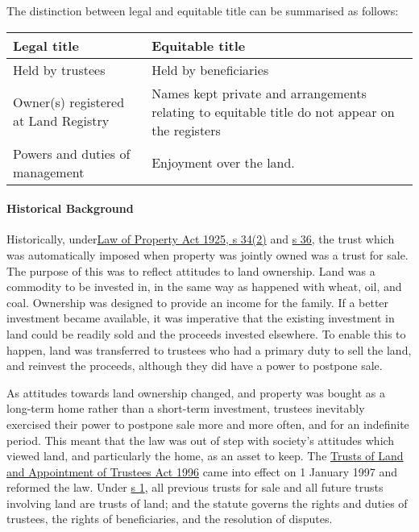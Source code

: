\documentclass[
]{article}
\begin{document}
The distinction between legal and equitable title can be summarised as
follows:

\begin{longtable}[]{@{}ll@{}}
\toprule()
Legal title & Equitable title \\
\midrule()
\endhead
Held by trustees & Held by beneficiaries \\
Owner(s) registered at Land Registry & Names kept private and
arrangements relating to equitable title do not appear on the
registers \\
Powers and duties of management & Enjoyment over the land. \\
\bottomrule()
\end{longtable}

\hypertarget{historical-background}{%
\paragraph{Historical Background}\label{historical-background}}

Historically,
under\href{https://www.legislation.gov.uk/ukpga/Geo5/15-16/20/section/34}{Law
of Property Act 1925, s 34(2)} and
\href{https://www.legislation.gov.uk/ukpga/Geo5/15-16/20/section/36}{s
36}, the trust which was automatically imposed when property was jointly
owned was a trust for sale. The purpose of this was to reflect attitudes
to land ownership. Land was a commodity to be invested in, in the same
way as happened with wheat, oil, and coal. Ownership was designed to
provide an income for the family. If a better investment became
available, it was imperative that the existing investment in land could
be readily sold and the proceeds invested elsewhere. To enable this to
happen, land was transferred to trustees who had a primary duty to sell
the land, and reinvest the proceeds, although they did have a power to
postpone sale.

As attitudes towards land ownership changed, and property was bought as
a long-term home rather than a short-term investment, trustees
inevitably exercised their power to postpone sale more and more often,
and for an indefinite period. This meant that the law was out of step
with society's attitudes which viewed land, and particularly the home,
as an asset to keep. The
\href{https://www.legislation.gov.uk/ukpga/1996/47/contents}{Trusts of
Land and Appointment of Trustees Act 1996} came into effect on 1 January
1997 and reformed the law. Under
\href{https://www.legislation.gov.uk/ukpga/1996/47/section/1}{s 1}, all
previous trusts for sale and all future trusts involving land are trusts
of land; and the statute governs the rights and duties of trustees, the
rights of beneficiaries, and the resolution of disputes.
\end{document}
